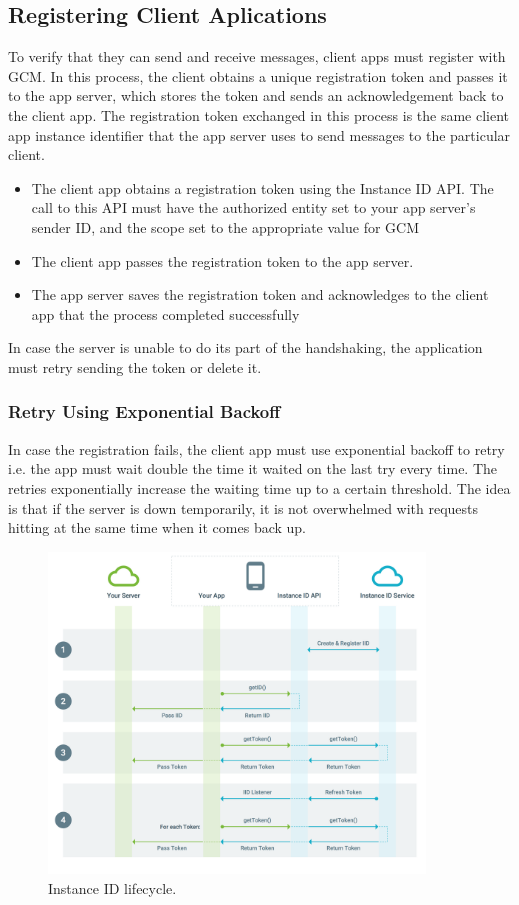 \subsection{Registering Client Aplications}
To verify that they can send and receive messages, client apps must register with GCM. In this process, the client obtains a unique registration token and passes it to the app server, which stores the token and sends an acknowledgement back to the client app. The registration token exchanged in this process is the same client app instance identifier that the app server uses to send messages to the particular client.
\begin{itemize}
	\item The client app obtains a registration token using the Instance ID API. The call to this API must have the authorized entity set to your app server's sender ID, and the scope set to the appropriate value for GCM 
	\item The client app passes the registration token to the app server.
	\item The app server saves the registration token and acknowledges to the client app that the process completed successfully
\end{itemize}
In case the server is unable to do its part of the handshaking, the application must retry sending the token or delete it.
\subsubsection{Retry Using Exponential Backoff}
 In case the registration fails, the client app must use exponential backoff to retry i.e. the app must wait double the time it waited on the last try every time.  The retries exponentially increase the waiting time up to a certain threshold. The idea is that if the server is down temporarily, it is not overwhelmed with requests hitting at the same time when it comes back up.
 \newpage
 \begin{figure}[h]
\centering
\includegraphics[width=10cm]{images/iid-lifecycle.png}
\caption{\label{fig:iid}Instance ID lifecycle.}
\end{figure}

